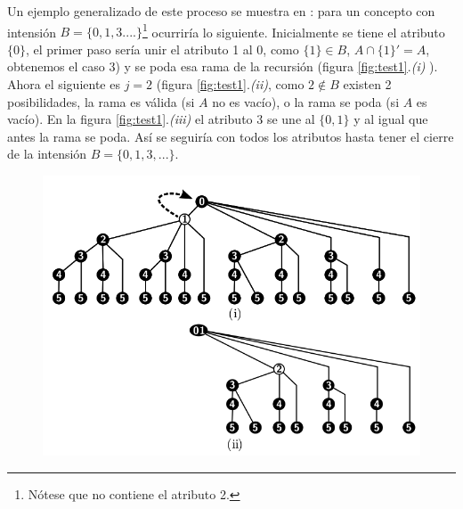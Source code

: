 \documentclass[oneside,openright,titlepage,numbers=noenddot,openany,headinclude,footinclude=true,
cleardoublepage=empty,abstractoff,BCOR=5mm,paper=a4,fontsize=12pt,main=spanish]{scrreprt}
\begin{document}
Un ejemplo generalizado de este proceso se muestra en \cite{inclose}: para un concepto con intensión $B=\{0,1,3....\}$\footnote{Nótese que no contiene el atributo 2.} ocurriría lo siguiente. Inicialmente se tiene el atributo $\{0\}$, el primer paso sería unir el atributo 1 al 0, como $\{1\} \in B$, $A \cap \{1\}' = A$, obtenemos el caso 3) y se poda esa rama de la recursión (figura \ref{fig:test1}.\textit{(i)} ). Ahora el siguiente es $j=2$ (figura \ref{fig:test1}.\textit{(ii)}, como $2 \notin B$ existen 2 posibilidades, la rama es válida (si $A$ no es vacío), o la rama se poda (si $A$ es vacío). En la figura \ref{fig:test1}.\textit{(iii)} el atributo 3 se une al $\{0,1\}$ y al igual que antes la rama se poda. Así se seguiría con todos los atributos hasta tener el cierre de la intensión $B=\{0,1,3,...\}$.


\begin{figure}[H]
\centering
\begin{minipage}{.6\textwidth}
  \centering
  \includegraphics[width=1\linewidth]{images/inclose1.png}


\end{minipage}
\end{figure}
\end{document}
